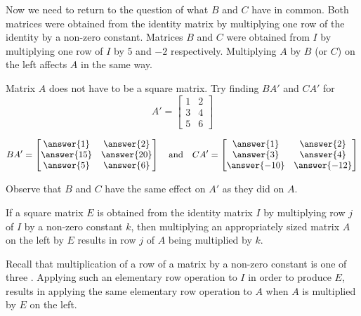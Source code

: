 \documentclass{ximera}
\begin{document}
\begin{initprob}
Now we need to return to the question of what $B$ and $C$ have in common.  Both matrices were obtained from the identity matrix by multiplying one row of the identity by a non-zero constant.  Matrices $B$ and $C$ were obtained from $I$ by multiplying one row of $I$ by $5$ and $-2$ respectively.  Multiplying $A$ by $B$ (or $C$) on the left affects $A$ in the same way.

Matrix $A$ does not have to be a square matrix.  Try finding $BA'$ and $CA'$ for 
$$A'=\begin{bmatrix}1&2\\3&4\\5&6\end{bmatrix}$$

$$BA'=\begin{bmatrix}\answer{1}&\answer{2}\\\answer{15}&\answer{20}\\\answer{5}&\answer{6}\end{bmatrix}\quad\text{and}\quad CA'=\begin{bmatrix}\answer{1}&\answer{2}\\\answer{3}&\answer{4}\\\answer{-10}&\answer{-12}\end{bmatrix}$$

Observe that $B$ and $C$ have the same effect on $A'$ as they did on $A$.


 \end{initprob}
 
 \begin{general} If a square matrix $E$ is obtained from the identity matrix $I$ by multiplying row $j$ of $I$ by a non-zero constant $k$, then multiplying an appropriately sized matrix $A$ on the left by $E$ results in row $j$ of $A$ being multiplied by $k$.  
 
 Recall that multiplication of a row of a matrix by a non-zero constant is one of three .  Applying such an elementary row operation to $I$ in order to produce $E$, results in applying the same elementary row operation to $A$ when $A$ is multiplied by $E$ on the left.
 \end{general}
\end{document}
